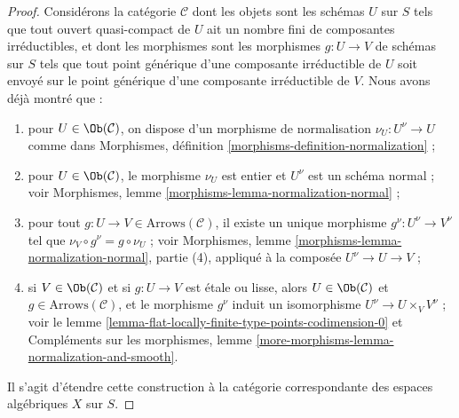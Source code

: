 \begin{proof}
Considérons la catégorie $\mathcal{C}$ dont les objets sont les
schémas $U$ sur $S$ tels que tout ouvert quasi-compact de
$U$ ait un nombre fini de composantes irréductibles, et dont les morphismes
sont les morphismes $g : U \to V$ de schémas sur $S$ tels
que tout point générique d'une composante irréductible de $U$
soit envoyé sur le point générique d'une composante irréductible de $V$.
Nous avons déjà montré que :
\begin{enumerate}
\item[(a)] pour $U \in \Ob(\mathcal{C})$, on dispose d'un
morphisme de normalisation $\nu_U : U^\nu \to U$ comme dans
Morphismes, définition \ref{morphisms-definition-normalization} ;
\item[(b)] pour $U \in \Ob(\mathcal{C})$, le morphisme $\nu_U$
est entier et $U^\nu$ est un schéma normal ; voir
Morphismes, lemme \ref{morphisms-lemma-normalization-normal} ;
\item[(c)] pour tout $g : U \to V \in \text{Arrows}(\mathcal{C})$,
il existe un unique morphisme $g^\nu : U^\nu \to V^\nu$
tel que $\nu_V \circ g^\nu = g \circ \nu_U$ ; voir
Morphismes, lemme \ref{morphisms-lemma-normalization-normal},
partie (4), appliqué à la composée $U^\nu \to U \to V$ ;
\item[(d)] si $V \in \Ob(\mathcal{C})$ et si $g : U \to V$ est
étale ou lisse, alors $U \in \Ob(\mathcal{C})$ et
$g \in \text{Arrows}(\mathcal{C})$, et le morphisme $g^\nu$
induit un isomorphisme $U^\nu \to U \times_V V^\nu$ ; voir le
lemme \ref{lemma-flat-locally-finite-type-points-codimension-0}
et Compléments sur les morphismes, lemme
\ref{more-morphisms-lemma-normalization-and-smooth}.
\end{enumerate}
Il s'agit d'étendre cette construction à la catégorie correspondante
des espaces algébriques $X$ sur $S$.


\end{proof}

